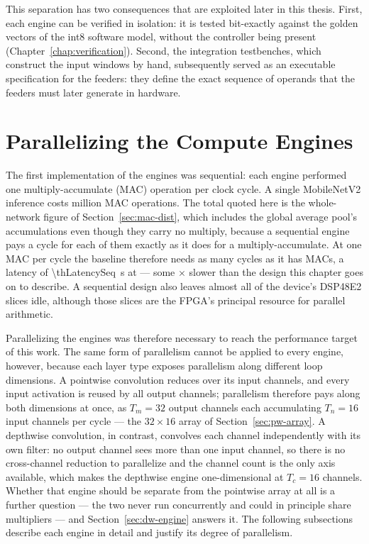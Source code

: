 This separation has two consequences that are exploited later in this thesis.
First, each engine can be verified in isolation: it is tested bit-exactly
against the golden vectors of the int8 software model, without the controller
being present (Chapter~\ref{chap:verification}). Second, the integration
testbenches, which construct the input windows by hand, subsequently served as
an executable specification for the feeders: they define the exact sequence of
operands that the feeders must later generate in hardware.

\section{Parallelizing the Compute Engines}
\label{sec:parallelism}

The first implementation of the engines was sequential: each engine performed
one multiply-accumulate (MAC) operation per clock cycle. A single MobileNetV2
inference costs \thMacsM{} million MAC operations. The total quoted here is the
whole-network figure of Section~\ref{sec:mac-dist}, which includes the global
average pool's accumulations even though they carry no multiply, because a
sequential engine pays a cycle for each of them exactly as it does for a
multiply-accumulate. At one MAC per cycle the baseline therefore needs as many
cycles as it has MACs, a latency of \SI{\thLatencySeq}{\second} at
\MHz{\thClkBoard} --- some \thSpeedupSeq$\times$ slower than the design this
chapter goes on to describe. A sequential design also leaves almost all of the
device's DSP48E2 slices idle, although those slices are the FPGA's principal
resource for parallel arithmetic.

Parallelizing the engines was therefore necessary to reach the performance
target of this work. The same form of parallelism cannot be applied to every
engine, however, because each layer type exposes parallelism along different
loop dimensions. A pointwise convolution reduces over its input channels, and
every input activation is reused by all output channels; parallelism therefore
pays along both dimensions at once, as $T_m = 32$ output channels each
accumulating $T_n = 16$ input channels per cycle --- the $32 \times 16$ array
of Section~\ref{sec:pw-array}. A depthwise convolution, in contrast, convolves
each channel independently with its own filter: no output channel sees more
than one input channel, so there is no cross-channel reduction to parallelize
and the channel count is the only axis available, which makes the depthwise
engine one-dimensional at $T_c = 16$ channels. Whether that engine should be
separate from the pointwise array at all is a further question --- the two
never run concurrently and could in principle share multipliers --- and
Section~\ref{sec:dw-engine} answers it. The following subsections describe each
engine in detail and justify its degree of parallelism.
